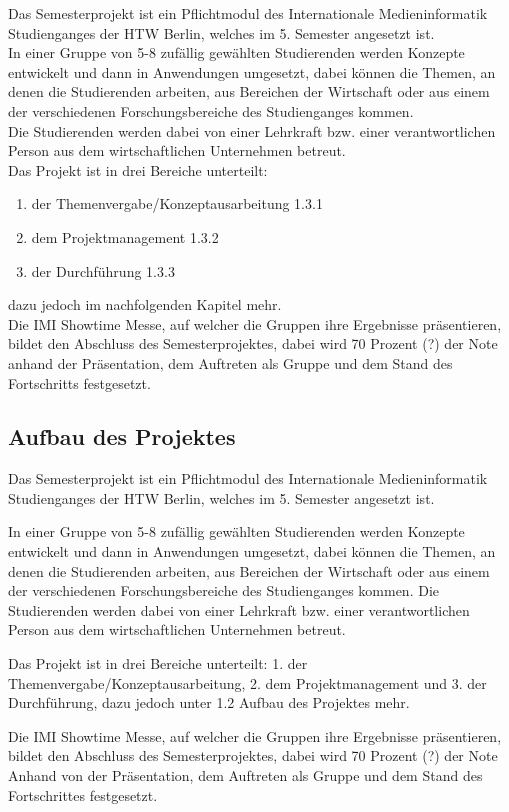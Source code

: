 \documentclass[11pt]{article}
\begin{document}
Das Semesterprojekt ist ein Pflichtmodul des Internationale Medieninformatik Studienganges der HTW Berlin, welches im 5. Semester angesetzt ist. \\
In einer Gruppe von 5-8 zufällig gewählten Studierenden werden Konzepte entwickelt und dann in Anwendungen umgesetzt, dabei können die Themen, an denen die Studierenden arbeiten, aus Bereichen der Wirtschaft oder aus einem der verschiedenen Forschungsbereiche des Studienganges kommen. \\
Die Studierenden werden dabei von einer Lehrkraft bzw. einer verantwortlichen Person aus dem wirtschaftlichen Unternehmen betreut.\\
Das Projekt ist in drei Bereiche unterteilt: 
\begin{enumerate}
	\item der Themenvergabe/Konzeptausarbeitung 1.3.1
	\item dem Projektmanagement 1.3.2
	\item der Durchführung 1.3.3
\end{enumerate}
dazu jedoch im nachfolgenden Kapitel mehr.\\
Die IMI Showtime Messe, auf welcher die Gruppen ihre Ergebnisse präsentieren, bildet den Abschluss des Semesterprojektes, dabei wird 70 Prozent (?) der Note anhand der Präsentation, dem Auftreten als Gruppe und dem Stand des Fortschritts festgesetzt.

\subsection{Aufbau des Projektes}
\label{chap: Aufbau}

Das Semesterprojekt ist ein Pflichtmodul des Internationale Medieninformatik Studienganges der HTW Berlin, welches im 5. Semester angesetzt ist.

In einer Gruppe von 5-8 zufällig gewählten Studierenden werden Konzepte entwickelt und dann in Anwendungen umgesetzt, dabei können die Themen, an denen die Studierenden arbeiten, aus Bereichen der Wirtschaft oder aus einem der verschiedenen Forschungsbereiche des Studienganges kommen.
Die Studierenden werden dabei von einer Lehrkraft bzw. einer verantwortlichen Person aus dem wirtschaftlichen Unternehmen betreut.

Das Projekt ist in drei Bereiche unterteilt: 1. der Themenvergabe/Konzeptausarbeitung, 2. dem Projektmanagement und 3. der Durchführung, dazu jedoch unter 1.2 Aufbau des Projektes mehr.

Die IMI Showtime Messe, auf welcher die Gruppen ihre Ergebnisse präsentieren, bildet den Abschluss des Semesterprojektes, dabei wird 70 Prozent (?) der Note Anhand von der Präsentation, dem Auftreten als Gruppe und dem Stand des Fortschrittes festgesetzt.
\end{document}
